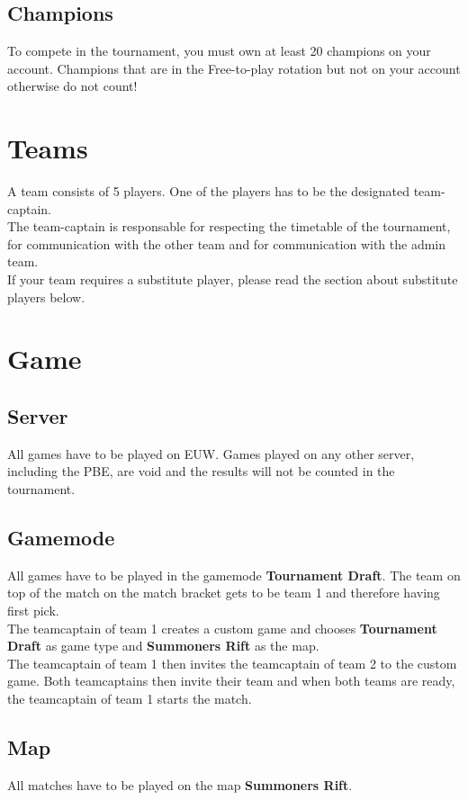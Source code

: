 \documentclass{article}
\begin{document}
\subsection{Champions}
To compete in the tournament, you must own at least 20 champions on your account. Champions that are in the Free-to-play rotation but not on your account otherwise do not count!


\section{Teams}
A team consists of 5 players. One of the players has to be the designated team-captain.
\\
The team-captain is responsable for respecting the timetable of the tournament, for communication with the other team and for communication with the admin team.
\\
If your team requires a substitute player, please read the section about substitute players below.

\section{Game}
\subsection{Server}
All games have to be played on EUW. Games played on any other server, including the PBE, are void and the results will not be counted in the tournament.

\subsection{Gamemode}
All games have to be played in the gamemode \textbf{Tournament Draft}. The team on top of the match on the match bracket gets to be team 1 and therefore having first pick. 
\\
The teamcaptain of team 1 creates a custom game and chooses \textbf{Tournament Draft} as game type and \textbf{Summoners Rift} as the map.
\\
The teamcaptain of team 1 then invites the teamcaptain of team 2 to the custom game. Both teamcaptains then invite their team and when both teams are ready, the teamcaptain of team 1 starts the match.
\subsection{Map}
All matches have to be played on the map \textbf{Summoners Rift}.
\end{document}
